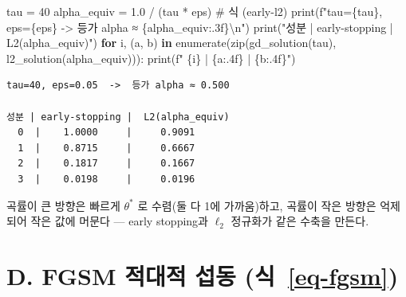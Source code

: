 \documentclass[
  letterpaper,
  DIV=11,
  numbers=noendperiod]{scrreprt}
\newenvironment{Shaded}{\begin{snugshade}}{\end{snugshade}}
\newcommand{\BuiltInTok}[1]{\textcolor[rgb]{0.00,0.23,0.31}{#1}}
\newcommand{\CharTok}[1]{\textcolor[rgb]{0.13,0.47,0.30}{#1}}
\newcommand{\CommentTok}[1]{\textcolor[rgb]{0.37,0.37,0.37}{#1}}
\newcommand{\ControlFlowTok}[1]{\textcolor[rgb]{0.00,0.23,0.31}{\textbf{#1}}}
\newcommand{\DecValTok}[1]{\textcolor[rgb]{0.68,0.00,0.00}{#1}}
\newcommand{\FloatTok}[1]{\textcolor[rgb]{0.68,0.00,0.00}{#1}}
\newcommand{\KeywordTok}[1]{\textcolor[rgb]{0.00,0.23,0.31}{\textbf{#1}}}
\newcommand{\NormalTok}[1]{\textcolor[rgb]{0.00,0.23,0.31}{#1}}
\newcommand{\OperatorTok}[1]{\textcolor[rgb]{0.37,0.37,0.37}{#1}}
\newcommand{\SpecialCharTok}[1]{\textcolor[rgb]{0.37,0.37,0.37}{#1}}
\newcommand{\SpecialStringTok}[1]{\textcolor[rgb]{0.13,0.47,0.30}{#1}}
\newcommand{\StringTok}[1]{\textcolor[rgb]{0.13,0.47,0.30}{#1}}
\begin{document}
\begin{Shaded}
\begin{Highlighting}[]
\NormalTok{tau }\OperatorTok{=} \DecValTok{40}
\NormalTok{alpha\_equiv }\OperatorTok{=} \FloatTok{1.0} \OperatorTok{/}\NormalTok{ (tau }\OperatorTok{*}\NormalTok{ eps)          }\CommentTok{\# 식 (early{-}l2)}
\BuiltInTok{print}\NormalTok{(}\SpecialStringTok{f"tau=}\SpecialCharTok{\{}\NormalTok{tau}\SpecialCharTok{\}}\SpecialStringTok{, eps=}\SpecialCharTok{\{}\NormalTok{eps}\SpecialCharTok{\}}\SpecialStringTok{  {-}\textgreater{}  등가 alpha ≈ }\SpecialCharTok{\{}\NormalTok{alpha\_equiv}\SpecialCharTok{:.3f\}}\CharTok{\textbackslash{}n}\SpecialStringTok{"}\NormalTok{)}
\BuiltInTok{print}\NormalTok{(}\StringTok{"성분 | early{-}stopping |  L2(alpha\_equiv)"}\NormalTok{)}
\ControlFlowTok{for}\NormalTok{ i, (a, b) }\KeywordTok{in} \BuiltInTok{enumerate}\NormalTok{(}\BuiltInTok{zip}\NormalTok{(gd\_solution(tau), l2\_solution(alpha\_equiv))):}
    \BuiltInTok{print}\NormalTok{(}\SpecialStringTok{f"  }\SpecialCharTok{\{}\NormalTok{i}\SpecialCharTok{\}}\SpecialStringTok{  |    }\SpecialCharTok{\{}\NormalTok{a}\SpecialCharTok{:.4f\}}\SpecialStringTok{     |     }\SpecialCharTok{\{}\NormalTok{b}\SpecialCharTok{:.4f\}}\SpecialStringTok{"}\NormalTok{)}
\end{Highlighting}
\end{Shaded}

\begin{verbatim}
tau=40, eps=0.05  ->  등가 alpha ≈ 0.500

성분 | early-stopping |  L2(alpha_equiv)
  0  |    1.0000     |     0.9091
  1  |    0.8715     |     0.6667
  2  |    0.1817     |     0.1667
  3  |    0.0198     |     0.0196
\end{verbatim}

곡률이 큰 방향은 빠르게 \(\theta^*\) 로 수렴(둘 다 1에 가까움)하고,
곡률이 작은 방향은 억제되어 작은 값에 머문다 --- early stopping과
\(\ell_2\) 정규화가 같은 수축을 만든다.

\section{\texorpdfstring{D. FGSM 적대적 섭동
(식~\ref{eq-fgsm})}{D. FGSM 적대적 섭동 (식~)}}\label{d.-fgsm-uxc801uxb300uxc801-uxc12duxb3d9-eq-fgsm}
\end{document}
